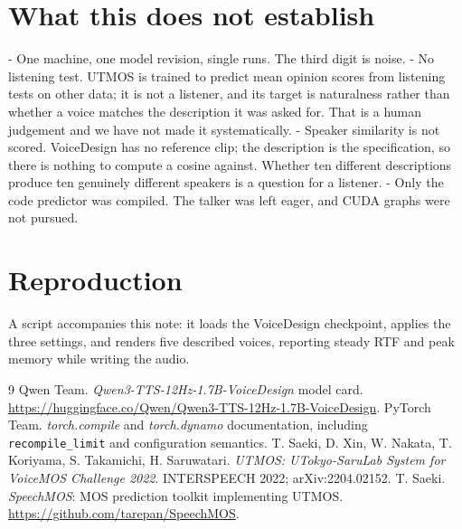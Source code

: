 \documentclass[11pt]{article}
\begin{document}
\section{What this does not establish}

- One machine, one model revision, single runs. The third digit is noise.
- No listening test. UTMOS \cite{utmos} is trained to predict mean opinion scores from listening tests on other
  data; it is not a listener, and its target is naturalness rather than whether a voice matches the description it
  was asked for. That is a human judgement and we have not made it systematically.
- Speaker similarity is not scored. VoiceDesign has no reference clip; the description is the specification, so
  there is nothing to compute a cosine against. Whether ten different descriptions produce ten genuinely different
  speakers is a question for a listener.
- Only the code predictor was compiled. The talker was left eager, and CUDA graphs were not pursued.

\section{Reproduction}

A script accompanies this note: it loads the VoiceDesign checkpoint, applies the three settings, and renders five
described voices, reporting steady RTF and peak memory while writing the audio.

\begin{thebibliography}{9}
 Qwen Team. \emph{Qwen3-TTS-12Hz-1.7B-VoiceDesign} model card.
\url{https://huggingface.co/Qwen/Qwen3-TTS-12Hz-1.7B-VoiceDesign}.
 PyTorch Team. \emph{torch.compile} and \emph{torch.dynamo} documentation, including
\texttt{recompile\_limit} and configuration semantics.
 T. Saeki, D. Xin, W. Nakata, T. Koriyama, S. Takamichi, H. Saruwatari.
\emph{UTMOS: UTokyo-SaruLab System for VoiceMOS Challenge 2022}. INTERSPEECH 2022; arXiv:2204.02152.
 T. Saeki. \emph{SpeechMOS}: MOS prediction toolkit implementing UTMOS.
\url{https://github.com/tarepan/SpeechMOS}.
\end{thebibliography}
\end{document}
